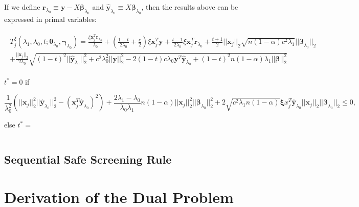 If we define $\boldsymbol r_{\lambda_0}\equiv \boldsymbol y-X\boldsymbol\beta_{\lambda_0}$ and $\hat{\boldsymbol y}_{\lambda_0}\equiv X\boldsymbol\beta_{\lambda_0}$, then the results above can be expressed in primal variables:

\begin{gather}
    \begin{aligned}
        T^\xi_j(\lambda_1,\lambda_0,t;\boldsymbol\theta_{\lambda_0},\boldsymbol\gamma_{\lambda_0})= \frac{\xi \boldsymbol x_j^T \boldsymbol r_{\lambda_0}}{\lambda_0}+ \left(\frac{1-t}{2\lambda_0}+\frac{c}{2}\right)\xi\boldsymbol x_j^T \boldsymbol y+\frac{t-1}{2\lambda_0}\xi \boldsymbol x_j^T \boldsymbol r_{\lambda_0}+\frac{t+1}{2}||\boldsymbol x_j||_2\sqrt{n(1-\alpha) c^2\lambda_1}||\boldsymbol\beta_{\lambda_0}||_2\\
        +\frac{||\boldsymbol x_j||_2}{2\lambda_0}\sqrt{(1-t)^2||\hat{\boldsymbol y}_{\lambda_0}||_2^2+c^2\lambda_0^2||\boldsymbol y||_2^2-2(1-t)c\lambda_0 \boldsymbol y^T\hat{\boldsymbol y}_{\lambda_0}+(1-t)^2n(1-\alpha)\lambda_1||\boldsymbol\beta||_2^2}
    \end{aligned}
\end{gather}

$t^*=0$ if

\begin{equation}
    \frac{1}{\lambda_0^2}\left(||\boldsymbol x_j||_2^2||\hat{\boldsymbol y}_{\lambda_0}||_2^2-(\boldsymbol x_j^T\hat{\boldsymbol y}_{\lambda_0})^2\right)+\frac{2\lambda_1-\lambda_0}{\lambda_0\lambda_1}n(1-\alpha)||\boldsymbol x_j||_2^2||\boldsymbol\beta_{\lambda_0}||_2^2+2\sqrt{c^2\lambda_1n(1-\alpha)}\boldsymbol \xi x_j^T\hat{\boldsymbol y}_{\lambda_0}||\boldsymbol x_j||_2||\boldsymbol\beta_{\lambda_0}||_2\leq 0,
\end{equation}

else $t^*=$

\begin{equation}
    \,
\end{equation}

\subsection{Sequential Safe Screening Rule}


\appendix
\appendixpage


\section{Derivation of the Dual Problem}



